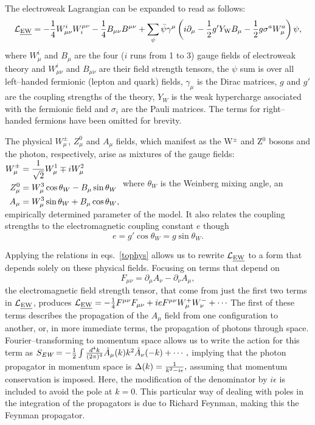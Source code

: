 The electroweak Lagrangian can be expanded to read as follows:
\[\mathcal{L}_\text{\emph{EW}}=-\frac{1}{4}W^i_{\mu\nu}W_i^{\mu\nu}-\frac{1}{4}B_{\mu\nu}B^{\mu\nu}+\sum_\psi\bar\psi\gamma^\mu \left(i\partial_\mu-{1\over2}g^\prime Y_\mathrm{W}B_\mu-{1\over2}g\sigma^a W^a_\mu\right)\psi,\]
where $W^i_{\mu}$ and $B_{\mu}$ are the four ($i$ runs from 1 to 3) gauge fields of electroweak theory and $W^i_{\mu\nu}$ and $B_{\mu\nu}$ are their field strength tensors, the $\psi$ sum is over all left--handed fermionic (lepton and quark) fields, $\gamma_{\mu}$ is the Dirac matrices, $g$ and $g'$ are the coupling strengths of the theory, $Y_W$ is the weak hypercharge associated with the fermionic field and $\sigma_i$ are the Pauli matrices. The terms for right--handed fermions have been omitted for brevity.

The physical $W^\pm_\mu$, $Z^0_\mu$ and $A_\mu$ fields, which manifest as the W$^\pm$ and Z$^0$ bosons and the photon, respectively, arise as mixtures of the gauge fields:
\(\begin{aligned}
W_\mu^\pm&=\frac{1}{\sqrt{2}} W^1_\mu\mp iW^2_\mu\\
Z^0_\mu&=W^3_\mu\cos \theta_W-B_\mu\sin \theta_W\\
A_\mu&=W^3_\mu\sin\theta_W+B_\mu\cos\theta_W,
\end{aligned}\label{tophys}\)
where $\theta_W$ is the Weinberg mixing angle, an empirically determined parameter of the model. It also relates the coupling strengths to the electromagnetic coupling constant $e$ though
\[e=g'\cos\theta_W=g\sin\theta_W.\]

Applying the relations in eqs.~\eqref{tophys} allows us to rewrite $\mathcal{L}_{\text{\emph{EW}}}$ to a form that depends solely on these physical fields. Focusing on terms that depend on
\[F_{\mu\nu}=\partial_\mu A_\nu - \partial_\nu A_\mu,\]
the electromagnetic field strength tensor, that come from just the first two terms in $\mathcal{L}_{\text{\emph{EW}}}$, produces
\(\mathcal{L}_{\text{\emph{EW}}}=-\ono4 F^{\mu\nu}F_{\mu\nu}+ie F^{\mu\nu}W^{+}_\mu W^{-}_\nu+\cdots\label{ewfmn}\)
The first of these terms describes the propagation of the $A_\mu$ field from one configuration to another, or, in more immediate terms, the propagation of photons through space. Fourier--transforming to momentum space allows us to write the action for this term as
\(S_{\textit{EW}}=-\frac{1}{2}\int\frac{d^4k}{(2\pi)^4}\tilde A_\mu(k)k^2\tilde A_\nu(-k)+\cdots,\)
implying that the photon propagator in momentum space is
\(\Delta(k)=\frac{1}{k^2-i\epsilon},\label{phoprop}\)
assuming that momentum conservation is imposed. Here, the modification of the denominator by $i\epsilon$ is included to avoid the pole at $k=0$. This particular way of dealing with poles in the integration of the propagators is due to Richard Feynman, making this the Feynman propagator.

